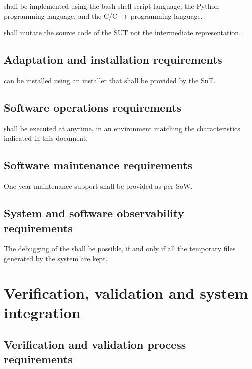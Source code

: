\RQ{} \FAQAS shall be implemented using the bash shell script language, the Python programming language, and the C/C++ programming language.

\RQ{} \FAQAS shall mutate the source code of the SUT not the intermediate representation.


\section{Adaptation and installation requirements}


% 
\RQ{} \FAQAS can be installed using an installer that shall be provided by the SnT.


\section{Software operations requirements}

\RQ{} \FAQAS shall be executed at anytime, 
in an environment matching the characteristics indicated in this document.

\section{Software maintenance requirements}

\RQ{} One year maintenance support shall be provided as per SoW.

\section{System and software observability requirements}

\RQ{} The debugging of the \FAQAS shall be possible, if and only if 
all the temporary files generated by the system are kept.

\chapter{Verification, validation and system integration}
 \section{Verification and validation process requirements}
 

